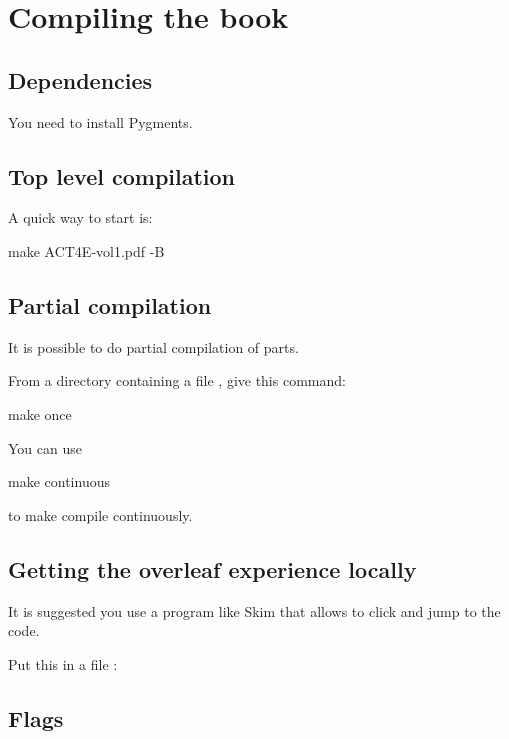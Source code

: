 \section{Compiling the book}

\subsection{Dependencies}

You need to install Pygments.

\subsection{Top level compilation}

A quick way to start is:

\begin{console}
  make ACT4E-vol1.pdf -B
\end{console}

\subsection{Partial compilation}

It is possible to do partial compilation of parts.

From a directory containing a file , give this command:

\begin{console}
  make once
\end{console}

You can use
%
\begin{console}
  make continuous
\end{console}
%
to make  compile continuously.

\subsection{Getting the overleaf experience locally}

It is suggested you use a program like Skim that allows to click and jump to the code.

Put this in a file :




\subsection{Flags}

